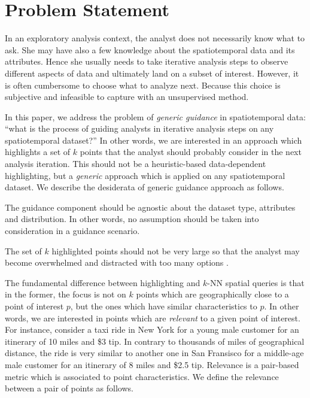 \section{Problem Statement}
\label{sec:pb}
In an exploratory analysis context, the analyst does not necessarily know what to ask. She may have also a few knowledge about the spatiotemporal data and its attributes. Hence she usually needs to take iterative analysis steps to observe different aspects of data and ultimately land on a subset of interest. However, it is often cumbersome to choose what to analyze next. Because this choice is subjective and infeasible to capture with an unsupervised method.

In this paper, we address the problem of {\em generic guidance} in spatiotemporal data: ``what is the process of guiding analysts in iterative analysis steps on any spatiotemporal dataset?'' In other words, we are interested in an approach which highlights a set of $k$ points that the analyst should probably consider in the next analysis iteration. This should not be a heuristic-based data-dependent highlighting, but a {\em generic} approach which is applied on any spatiotemporal dataset. We describe the desiderata of generic guidance approach as follows.

\vspace{5pt}
 The guidance component should be agnostic about the dataset type, attributes and distribution. In other words, no assumption should be taken into consideration in a guidance scenario.

\vspace{5pt}
 The set of $k$ highlighted points should not be very large so that the analyst may become overwhelmed and distracted with too many options \cite{miller1956human}.

\vspace{5pt}
 The fundamental difference between highlighting and $k$-NN spatial queries \cite{aly2015spatial} is that in the former, the focus is not on $k$ points which are geographically close to a point of interest $p$, but the ones which have similar characteristics to $p$. In other words, we are interested in points which are {\em relevant} to a given point of interest. For instance, consider a taxi ride in New York for a young male customer for an itinerary of 10 miles and \$3 tip. In contrary to thousands of miles of geographical distance, the ride is very similar to another one in San Fransisco for a middle-age male customer for an itinerary of 8 miles and \$2.5 tip. Relevance is a pair-based metric which is associated to point characteristics. We define the relevance between a pair of points as follows.

